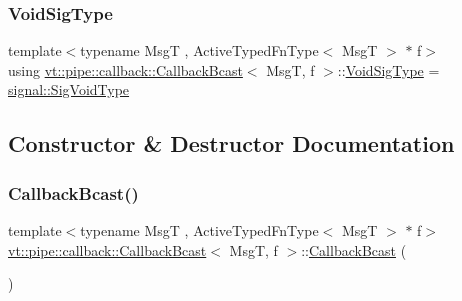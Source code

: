 \subsubsection{\texorpdfstring{Void\+Sig\+Type}{VoidSigType}}
{\footnotesize\ttfamily template$<$typename MsgT , Active\+Typed\+Fn\+Type$<$ Msg\+T $>$ $\ast$ f$>$ \\
using \hyperlink{structvt_1_1pipe_1_1callback_1_1_callback_bcast}{vt\+::pipe\+::callback\+::\+Callback\+Bcast}$<$ MsgT, f $>$\+::\hyperlink{structvt_1_1pipe_1_1callback_1_1_callback_bcast_a64032b57b71c27653b93b3e13bf38145}{Void\+Sig\+Type} =  \hyperlink{namespacevt_1_1pipe_1_1signal_acbe257d1ae44f20fa9fd9b6ed3057caf}{signal\+::\+Sig\+Void\+Type}}



\subsection{Constructor \& Destructor Documentation}
\mbox{\label{structvt_1_1pipe_1_1callback_1_1_callback_bcast_adbfcc31e986a2aed709b8517e0e978ae}} 
\subsubsection{\texorpdfstring{Callback\+Bcast()}{CallbackBcast()}\hspace{0.1cm}{\footnotesize\ttfamily [1/4]}}
{\footnotesize\ttfamily template$<$typename MsgT , Active\+Typed\+Fn\+Type$<$ Msg\+T $>$ $\ast$ f$>$ \\
\hyperlink{structvt_1_1pipe_1_1callback_1_1_callback_bcast}{vt\+::pipe\+::callback\+::\+Callback\+Bcast}$<$ MsgT, f $>$\+::\hyperlink{structvt_1_1pipe_1_1callback_1_1_callback_bcast}{Callback\+Bcast} (\begin{DoxyParamCaption}{ }\end{DoxyParamCaption})\hspace{0.3cm}{\ttfamily [default]}}

\mbox{\label{structvt_1_1pipe_1_1callback_1_1_callback_bcast_a7a711d532fcf9c8c91ab984e9848e2f0}} 
